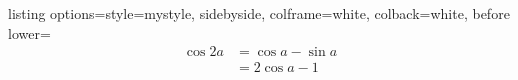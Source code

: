 \documentclass[12pt, a4paper]{article}
\begin{document}
%		
%		
%		
\begin{tcblisting}{listing options={style=mystyle}, sidebyside, colframe=white, colback=white, before lower={\vspace{-2em}}}
	\begin{align}
		\cos 2a & = \cos a - \sin a \nonumber \\
			& = 2\cos a - 1
	\end{align}
\end{tcblisting}
%
\end{document}

